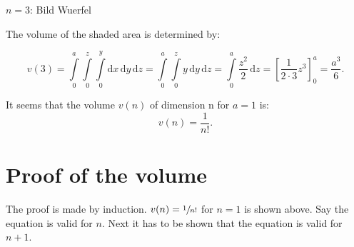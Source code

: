 \documentclass[11pt,paper=a4,oneside,ngerman,english,parskip=half]{scrartcl}
\begin{document}
$n = 3$:
Bild Wuerfel

The volume of the shaded area is determined by:

\begin{equation*}
v(3) = \int\limits_{0}^{a} \int\limits_{0}^{z} \int\limits_{0}^{y}\text{d}x\,\text{d}y\,\text{d}z  = \int\limits_{0}^{a} \int\limits_{0}^{z} y \,\text{d}y\,\text{d}z = \int\limits_{0}^{a} \frac{z^2}{2} \,\text{d}z =\left[\frac{1}{2\cdot 3}z^3\right]_{0}^{a} = \frac{a^3}{6}.
\end{equation*}

It seems that the volume $v(n)$ of dimension n for $a = 1$ is:
\begin{equation}
v(n) = \frac{1}{n!}.
\end{equation}


\section{Proof of the volume}
The proof is made by induction.
$v(n) = \sfrac{1}{n!}$ for $n = 1$ is shown above. Say the equation is valid for $n$. Next it has to be shown that the equation is valid for $n+1$. 







%





\printbibliography[title=Weiterführende Literatur]
\end{document}
